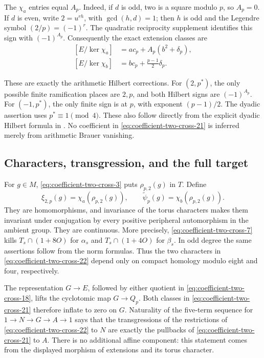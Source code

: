 The \(\chi_a\) entries equal \(A_p\). Indeed, if
\(d\) is odd, two is a square modulo \(p\), so
\(A_p=0\). If \(d\) is even, write
\(2=u^{rh}\), with \(\gcd(h,d)=1\); then \(h\)
is odd and the Legendre symbol \((2/p)=(-1)^r\).
The quadratic reciprocity supplement identifies
this sign with \((-1)^{A_p}\).
Consequently the exact extension classes are
\begin{equation}
 \begin{split}
 [E/\ker\chi_a]&=a c_p+A_p(b^2+\delta_p),\\
 [E/\ker\chi_b]&=b c_p+\frac{p-1}{2}\delta_p.
 \end{split}                                             \label{eq:coefficient-two-cross-21}
\end{equation}

These are exactly the arithmetic Hilbert corrections.
For \((2,p^*)\), the only possible finite ramification
places are \(2,p\), and both Hilbert signs are
\((-1)^{A_p}\). For \((-1,p^*)\), the only finite
sign is at \(p\), with exponent \((p-1)/2\).
The dyadic assertion uses \(p^*\equiv1\pmod4\).
These also follow directly from the explicit dyadic
Hilbert formula in \cite[VIII, \S5, p.~248]{MilneCFT}.
No coefficient in \eqref{eq:coefficient-two-cross-21} is inferred merely from
arithmetic Brauer vanishing.

\subsection{Characters, transgression, and the full target}

For \(g\in M\), \eqref{eq:coefficient-two-cross-3} puts \(\rho_{p,2}(g)\) in
\(T\). Define
\begin{equation}
               \xi_{2,p}(g)=\chi_a(\rho_{p,2}(g)),
       \qquad \widetilde\psi_p(g)=\chi_b(\rho_{p,2}(g)).
                                                        \label{eq:coefficient-two-cross-22}
\end{equation}
They are homomorphisms, and invariance of the torus
characters makes them invariant under conjugation
by every positive peripheral automorphism in the
ambient group. They are continuous. More precisely,
\eqref{eq:coefficient-two-cross-7} kills \(T_s\cap(1+8O)\) for \(\alpha_s\) and
\(T_s\cap(1+4O)\) for \(\beta_s\). In odd degree
the same assertions follow from the norm formulas.
Thus the two characters in \eqref{eq:coefficient-two-cross-22} depend only on
compact homology modulo eight and four, respectively.

The representation \(G\to E\), followed by
either quotient in \eqref{eq:coefficient-two-cross-18}, lifts the cyclotomic map
\(G\to Q_p\). Both classes in \eqref{eq:coefficient-two-cross-21} therefore inflate
to zero on \(G\). Naturality of the five-term
sequence for \(1\to N\to G\to A\to1\) says that
the transgressions of the restrictions of \eqref{eq:coefficient-two-cross-22} to
\(N\) are exactly the pullbacks of \eqref{eq:coefficient-two-cross-21} to \(A\).
There is no additional affine component: this
statement comes from the displayed morphism of
extensions and its torus character.

